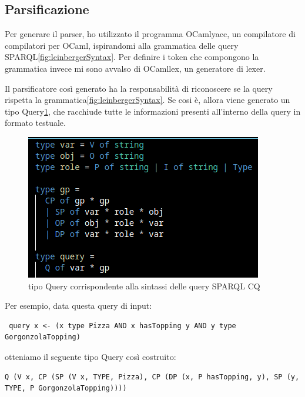 \subsection{Parsificazione}
Per generare il parser, ho utilizzato il programma OCamlyacc, un compilatore di compilatori per OCaml, ispirandomi alla grammatica delle query SPARQL\ref{fig:leinbergerSyntax}.
Per definire i token che compongono la grammatica invece mi sono avvalso di OCamllex, un generatore di lexer.

Il parsificatore così generato ha la responsabilità di riconoscere se la query rispetta la grammatica\ref{fig:leinbergerSyntax}. Se cosi è, allora viene generato un tipo Query\ref{fig:querType}, che racchiude tutte le informazioni presenti all'interno della query in formato testuale.

\begin{figure}[H]
    \centering
    \includegraphics[scale=0.7]{pictures/queryType.png}
    \caption{tipo Query corrispondente alla sintassi delle query SPARQL CQ}
    \label{fig:querType}
\end{figure}


Per esempio, data questa query di input:

\begin{verbatim}
 query x <- (x type Pizza AND x hasTopping y AND y type GorgonzolaTopping)
\end{verbatim}

otteniamo il seguente tipo Query così costruito:

\begin{verbatim}
Q (V x, CP (SP (V x, TYPE, Pizza), CP (DP (x, P hasTopping, y), SP (y, TYPE, P GorgonzolaTopping))))
\end{verbatim}

